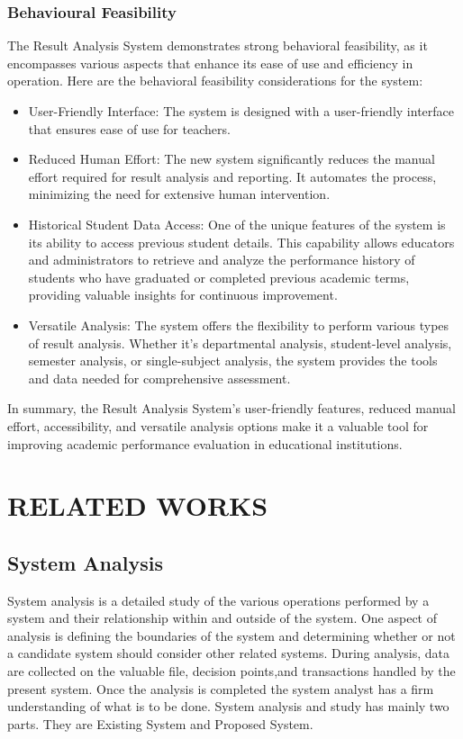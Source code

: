 \documentclass{nascproject}
\begin{document}
    \subsection{Behavioural Feasibility}
    The Result Analysis System demonstrates strong behavioral feasibility, as it encompasses various aspects that enhance its ease of use and efficiency in operation. Here are the behavioral feasibility considerations for the system:
    \begin{itemize}
    	\item User-Friendly Interface: The system is designed with a user-friendly interface that ensures ease of use for teachers.
    	\item Reduced Human Effort: The new system significantly reduces the manual effort required for result analysis and reporting. It automates the process, minimizing the need for extensive human intervention. 
    	\item Historical Student Data Access: One of the unique features of the system is its ability to access previous student details. This capability allows educators and administrators to retrieve and analyze the performance history of students who have graduated or completed previous academic terms, providing valuable insights for continuous improvement.
    	\item Versatile Analysis: The system offers the flexibility to perform various types of result analysis. Whether it's departmental analysis, student-level analysis, semester analysis, or single-subject analysis, the system provides the tools and data needed for comprehensive assessment.
    \end{itemize}
    
    In summary, the Result Analysis System's user-friendly features, reduced manual effort, accessibility, and versatile analysis options make it a valuable tool for improving academic performance evaluation in educational institutions.
   
   
   

\chapter{RELATED WORKS}
\section{System Analysis}
System analysis is a detailed study of the various operations performed by a system
and their relationship within and outside of the system. One aspect of analysis is defining the
boundaries of the system and determining whether or not a candidate system should consider
other related systems. During analysis, data are collected on the valuable file, decision points,and transactions handled by the present system. Once the analysis is completed the system
analyst has a firm understanding of what is to be done. System analysis and study has mainly
two parts. They are Existing System and Proposed System.
\end{document}
